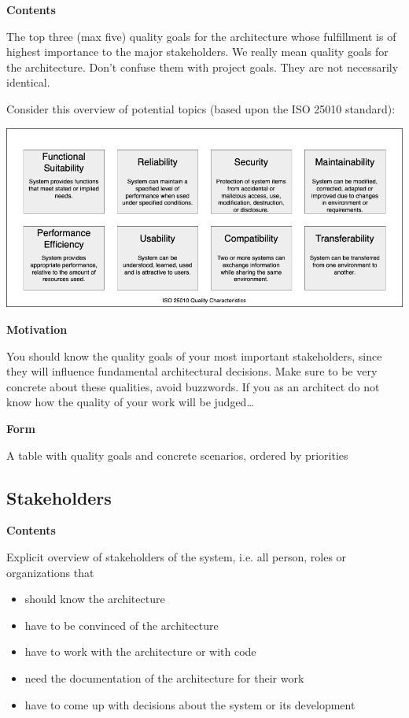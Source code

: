 \textbf{Contents}

The top three (max five) quality goals for the architecture whose
fulfillment is of highest importance to the major stakeholders. We
really mean quality goals for the architecture. Don't confuse them with
project goals. They are not necessarily identical.

Consider this overview of potential topics (based upon the ISO 25010
standard):

\includegraphics{images/01_2_iso-25010-topics-EN.drawio.png}

\textbf{Motivation}

You should know the quality goals of your most important stakeholders,
since they will influence fundamental architectural decisions. Make sure
to be very concrete about these qualities, avoid buzzwords. If you as an
architect do not know how the quality of your work will be
judged\ldots{}

\textbf{Form}

A table with quality goals and concrete scenarios, ordered by priorities

\hypertarget{_stakeholders}{%
\subsection{Stakeholders}\label{_stakeholders}}

\textbf{Contents}

Explicit overview of stakeholders of the system, i.e. all person, roles
or organizations that

\begin{itemize}
\item
  should know the architecture
\item
  have to be convinced of the architecture
\item
  have to work with the architecture or with code
\item
  need the documentation of the architecture for their work
\item
  have to come up with decisions about the system or its development
\end{itemize}

